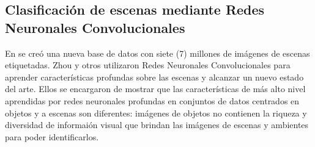 

\subsection{Clasificación de escenas mediante Redes Neuronales Convolucionales}


En \cite{learning_deep_features} se creó una nueva base de datos con siete (7) millones de imágenes de escenas etiquetadas. Zhou y otros utilizaron Redes Neuronales Convolucionales para aprender características profundas sobre las escenas y alcanzar un nuevo estado del arte. Ellos se encargaron de mostrar que las características de más alto nivel aprendidas por redes neuronales profundas en conjuntos de datos centrados en objetos y a escenas son diferentes: imágenes de objetos no contienen la riqueza y diversidad de informaión visual que brindan las imágenes de escenas y ambientes para poder identificarlos.

